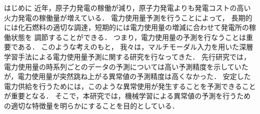 \documentclass[a4paper,10pt]{jarticle}
\makeatletter
\renewcommand{\section}{\@startsection{section}{1}{\z@}
  {1.5\Cvs \@plus.5\Cvs \@minus.2\Cvs}
  {.5\Cvs \@plus.3\Cvs}%
  {\reset@font\large\bfseries}}   %
\makeatother
\begin{document}
\section{はじめに}
\vspace{-2mm}
近年，原子力発電の稼働が減り，原子力発電よりも発電コストの高い火力発電の稼働量が増えている．
電力使用量予測を行うことによって，
長期的には化石燃料の適切な調達，短期的には電力使用量の増減に合わせて発電所の稼働状態を
調節することができる．
つまり，電力使用量の予測を行なうことは重要である\cite{kamata}．
このような考えのもと，
我々は，マルチモーダル入力を用いた深層学習手法による電力使用量予測に関する研究を行なってきた．
先行研究では，電力使用量の時系列ごとのデータの予測については高い予測精度を示していたが，電力使用量が突然跳ね上がる異常値の予測精度は高くなかった．
安定した電力供給を行うためには，このような異常使用が発生することを予測できることが重要となる．
そこで，本研究では，機械学習による異常値の予測を行うための適切な特徴量を明らかにすることを目的としている．
%

\vspace{-7mm}
\end{document}
